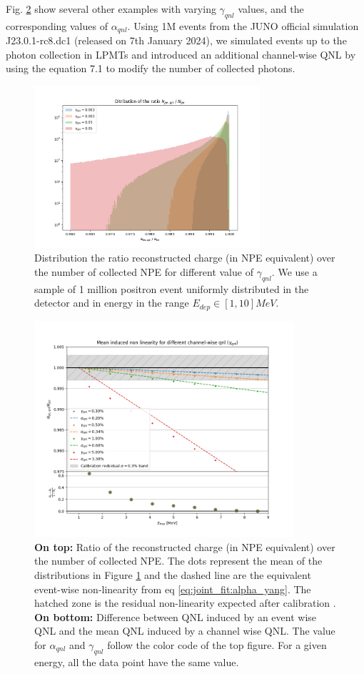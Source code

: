 \documentclass[../main.tex]{subfiles}
\begin{document}
Fig. \ref{fig:joint_fit:gamma_v_alpha} show several other examples with varying $\gamma_{qnl}$ values, and the corresponding values of $\alpha_{qnl}$.
Using 1M events from the JUNO official simulation J23.0.1-rc8.dc1 (released on 7th January 2024), we
simulated events up to the photon collection in LPMTs and introduced an additional channel-wise
QNL by using the equation 7.1 to modify the number of collected photons.

\begin{figure}[ht]
  \centering
  \includegraphics[height=6cm]{images/joint_fit/gamma_eff.png}
  \caption{Distribution the ratio reconstructed charge (in NPE equivalent) over the number of collected NPE for different value of $\gamma_{qnl}$. We use a sample of 1 million positron event uniformly distributed in the detector and in energy in the range $E_{dep} \in [1, 10] MeV$.}
  \label{fig:joint_fit:ratio_distrib}
\end{figure}
\begin{figure}[ht]
  \centering
  \includegraphics[height=8cm]{images/joint_fit/gamma_to_alpha.png}
  \caption{\textbf{On top:} Ratio of the reconstructed charge (in NPE equivalent) over the number of collected NPE. The dots represent the mean of the distributions in Figure \ref{fig:joint_fit:ratio_distrib} and the dashed line are the equivalent event-wise non-linearity from eq \ref{eq:joint_fit:alpha_yang}. The hatched zone is the residual non-linearity expected after calibration \cite{juno_collaboration_calibration_2021}. \textbf{On bottom:} Difference between QNL induced by an event wise QNL and the mean QNL induced by a channel wise QNL. The value for $\alpha_{qnl}$ and $\gamma_{qnl}$ follow the color code of the top figure. For a given energy, all the data point have the same value.}
  \label{fig:joint_fit:gamma_v_alpha}
\end{figure}
\end{document}
